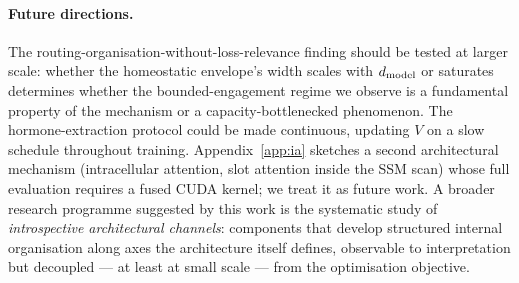 \paragraph{Future directions.} The routing-organisation-without-loss-relevance finding should be tested at larger scale: whether the homeostatic envelope's width scales with $d_{\text{model}}$ or saturates determines whether the bounded-engagement regime we observe is a fundamental property of the mechanism or a capacity-bottlenecked phenomenon. The hormone-extraction protocol could be made continuous, updating $V$ on a slow schedule throughout training. Appendix~\ref{app:ia} sketches a second architectural mechanism (intracellular attention, slot attention inside the SSM scan) whose full evaluation requires a fused CUDA kernel; we treat it as future work. A broader research programme suggested by this work is the systematic study of \emph{introspective architectural channels}: components that develop structured internal organisation along axes the architecture itself defines, observable to interpretation but decoupled --- at least at small scale --- from the optimisation objective.
